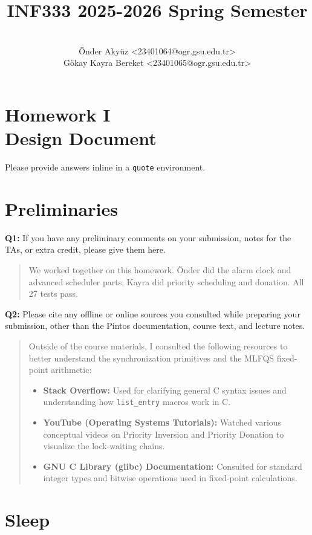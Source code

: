 \documentclass[a4paper,11pt]{paper}
\title{INF333 2025-2026 Spring Semester}
\author{
\textbf{\color{black}{Fanatics}} 
\\ Önder Akyüz <23401064@ogr.gsu.edu.tr>
\\ Gökay Kayra Bereket <23401065@ogr.gsu.edu.tr>}
\begin{document}
\maketitle

\section*{\LARGE Homework I \\
Design Document}

Please provide answers inline in a \texttt{quote} environment.


\section{Preliminaries}

\textbf{Q1:} If you have any preliminary comments on your submission, notes for
the TAs, or extra credit, please give them here.
\begin{quote}
We worked together on this homework. Önder did the alarm clock and advanced scheduler 
parts, Kayra did priority scheduling and donation. All 27 tests pass.
\end{quote}


\textbf{Q2:} Please cite any offline or online sources you consulted while
preparing your submission, other than the Pintos documentation, course text, and
lecture notes.

\begin{quote}
Outside of the course materials, I consulted the following resources to better understand the synchronization primitives and the MLFQS fixed-point arithmetic:

\begin{itemize}
    \item \textbf{Stack Overflow:} Used for clarifying general C syntax issues and understanding how \texttt{list\_entry} macros work in C.
    \item \textbf{YouTube (Operating Systems Tutorials):} Watched various conceptual videos on Priority Inversion and Priority Donation to visualize the lock-waiting chains.
    \item \textbf{GNU C Library (glibc) Documentation:} Consulted for standard integer types and bitwise operations used in fixed-point calculations.
\end{itemize}
\end{quote}


\section{Sleep}
\end{document}
